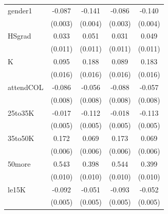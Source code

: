 \documentclass[11pt,a4paper,oldfontcommands]{memoir}
\begin{document}
{\begin{footnotesize}
\begin{footnotesize}
\begin{longtable}{l*{4}{c}}
gender1             &      -0.087\sym{***}&      -0.141\sym{***}&      -0.086\sym{***}&      -0.140\sym{***}\\
                    &     (0.003)         &     (0.004)         &     (0.003)         &     (0.004)         \\
 
HSgrad              &       0.033\sym{**} &       0.051\sym{***}&       0.031\sym{**} &       0.049\sym{***}\\
                    &     (0.011)         &     (0.011)         &     (0.011)         &     (0.011)         \\
 
K                   &       0.095\sym{***}&       0.188\sym{***}&       0.089\sym{***}&       0.183\sym{***}\\
                    &     (0.016)         &     (0.016)         &     (0.016)         &     (0.016)         \\
 
attendCOL           &      -0.086\sym{***}&      -0.056\sym{***}&      -0.088\sym{***}&      -0.057\sym{***}\\
                    &     (0.008)         &     (0.008)         &     (0.008)         &     (0.008)         \\
 
25to35K             &      -0.017\sym{***}&      -0.112\sym{***}&      -0.018\sym{***}&      -0.113\sym{***}\\
                    &     (0.005)         &     (0.005)         &     (0.005)         &     (0.005)         \\
 
35to50K             &       0.172\sym{***}&       0.069\sym{***}&       0.173\sym{***}&       0.069\sym{***}\\
                    &     (0.006)         &     (0.006)         &     (0.006)         &     (0.006)         \\
 
50more              &       0.543\sym{***}&       0.398\sym{***}&       0.544\sym{***}&       0.399\sym{***}\\
                    &     (0.010)         &     (0.010)         &     (0.010)         &     (0.010)         \\
 
le15K               &      -0.092\sym{***}&      -0.051\sym{***}&      -0.093\sym{***}&      -0.052\sym{***}\\
                    &     (0.005)         &     (0.005)         &     (0.005)         &     (0.005)         \\
 

\end{longtable}
\end{footnotesize}
\end{footnotesize}}
\end{document}
